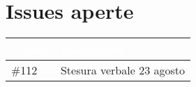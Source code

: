 \documentclass{classes/base}
\begin{document}
    \section*{Issues aperte}
    {
        
        \newlength{\freewidth}
        \setlength{\freewidth}{\dimexpr\textwidth-10\tabcolsep}
        \renewcommand{\arraystretch}{1.5}
        \centering
        \setlength{\aboverulesep}{0pt}
        \setlength{\belowrulesep}{0pt}
        \begin{longtable}{C{.13\freewidth} C{\freewidth}}
            \toprule
        \textcolor{white}{\textbf{Codice}}&
        \textcolor{white}{\textbf{Descrizione}}\\	
        \toprule
        \endhead
        
        \#112 & Stesura verbale 23 agosto \\

        \bottomrule
        \end{longtable}
    }
\end{document}
